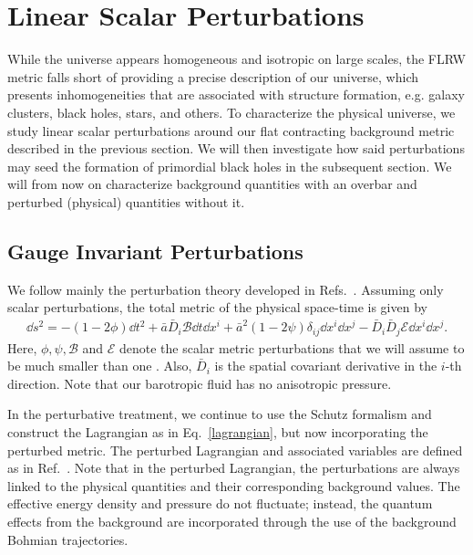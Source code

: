 \documentclass[a4paper,11pt]{article}
\begin{document}

\section{Linear Scalar Perturbations}
\label{linearpert}
While the universe appears homogeneous and isotropic on large scales, the FLRW metric falls short of providing a precise description of our universe, which presents inhomogeneities that are associated with structure formation, e.g. galaxy clusters, black holes, stars, and others. To characterize the physical universe, we study linear scalar perturbations around our flat contracting background metric described in the previous section. We will then investigate how said perturbations may seed the formation of primordial black holes in the subsequent section. We will from now on characterize background quantities with an overbar and perturbed (physical) quantities without it.

\subsection{Gauge Invariant Perturbations}

We follow mainly the perturbation theory developed in Refs.~\cite{covariant_bardeen,
	Vitenti2012}. Assuming only scalar perturbations, the total metric of the physical
space-time is given by
\begin{align}
	\label{physmetric-pert}
	\dd s^2 = -(1- 2 \phi)\dd t^2 + \bar{a}\bar{D}_i \mathcal{B} \dd t \dd x^i +
	\bar{a}^2(1-2 \psi)\delta_{ij}\dd x^i \dd x^j - \bar{D}_i\bar{D}_j \mathcal{E} \dd x^i \dd x^j
	.\end{align}
Here, $\phi, \psi, \mathcal{B}$ and $\mathcal{E}$ denote the scalar metric perturbations
that we will assume to be much smaller than one \cite{vitenti2012large}. Also,
$\bar{D}_i$ is the spatial covariant derivative in the $i$-th direction. Note that our
barotropic fluid has no anisotropic pressure.

	{\color{red} In the perturbative treatment, we continue to use the Schutz formalism
		and construct the Lagrangian as in Eq.~\eqref{lagrangian}, but now incorporating the
		perturbed metric. The perturbed Lagrangian and associated variables are defined as
		in Ref.~\cite{Vitenti2012}. Note that in the perturbed Lagrangian, the perturbations
		are always linked to the physical quantities and their corresponding background
		values. The effective energy density and pressure do not fluctuate; instead, the
		quantum effects from the background are incorporated through the use of the
		background Bohmian trajectories.}
\end{document}
